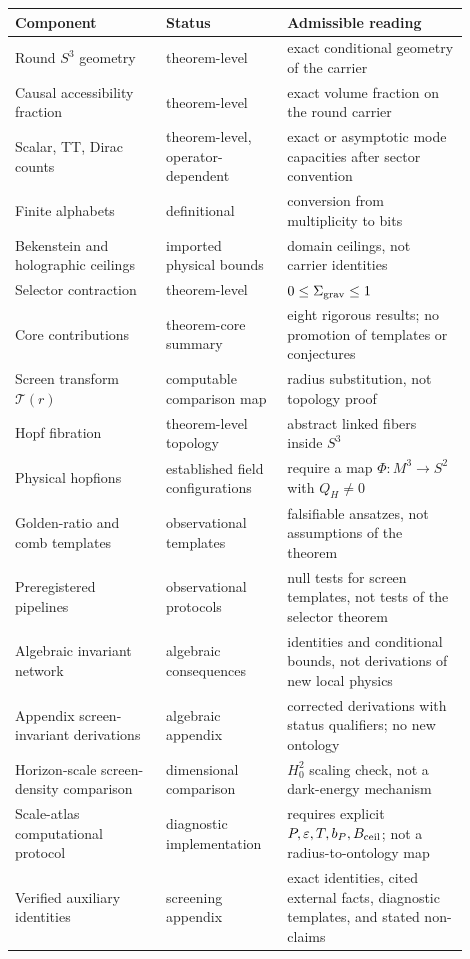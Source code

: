 \documentclass[11pt,a4paper]{article}
\begin{document}
{\small
\begin{longtable}{p{0.30\linewidth}p{0.24\linewidth}p{0.36\linewidth}}
\toprule
Component & Status & Admissible reading\\
\midrule
Round $S^3$ geometry & theorem-level & exact conditional geometry of the carrier\\
Causal accessibility fraction & theorem-level & exact volume fraction on the round carrier\\
Scalar, TT, Dirac counts & theorem-level, operator-dependent & exact or asymptotic mode capacities after sector convention\\
Finite alphabets & definitional & conversion from multiplicity to bits\\
Bekenstein and holographic ceilings & imported physical bounds & domain ceilings, not carrier identities\\
Selector contraction & theorem-level & $0\le\Sigma_{\rm grav}\le1$\\
Core contributions & theorem-core summary & eight rigorous results; no promotion of templates or conjectures\\
Screen transform $\mathcal T(r)$ & computable comparison map & radius substitution, not topology proof\\
Hopf fibration & theorem-level topology & abstract linked fibers inside $S^3$\\
Physical hopfions & established field configurations & require a map $\Phi:M^3\to S^2$ with $Q_H\ne0$\\
Golden-ratio and comb templates & observational templates & falsifiable ansatzes, not assumptions of the theorem\\
Preregistered pipelines & observational protocols & null tests for screen templates, not tests of the selector theorem\\
Algebraic invariant network & algebraic consequences & identities and conditional bounds, not derivations of new local physics\\
Appendix screen-invariant derivations & algebraic appendix & corrected derivations with status qualifiers; no new ontology\\
Horizon-scale screen-density comparison & dimensional comparison & $H_0^2$ scaling check, not a dark-energy mechanism\\
Scale-atlas computational protocol & diagnostic implementation & requires explicit \(P,\varepsilon,T,b_P,B_{\rm ceil}\); not a radius-to-ontology map\\
Verified auxiliary identities & screening appendix & exact identities, cited external facts, diagnostic templates, and stated non-claims\\

\end{longtable}}
\end{document}
